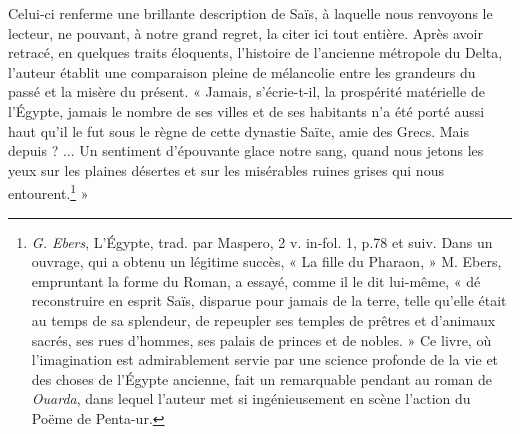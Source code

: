 \documentclass[a4paper, 11pt, oneside]{article}
\begin{document}
Celui-ci renferme une brillante description de Saïs, à laquelle nous renvoyons le lecteur, ne pouvant, à notre grand regret, la citer ici tout entière. Après avoir retracé, en quelques traits éloquents, l'histoire de l'ancienne métropole du Delta, l'auteur établit une comparaison pleine de mélancolie entre les grandeurs du passé et la misère du présent. « Jamais, s'écrie-t-il, la prospérité matérielle de l'Égypte, jamais le nombre de ses villes et de ses habitants n'a été porté aussi haut qu'il le fut sous le règne de cette dynastie Saïte, amie des Grecs. Mais depuis ? ... Un sentiment d'épouvante glace notre sang, quand nous jetons les yeux sur les plaines désertes et sur les misérables ruines grises qui nous entourent.\footnote{\emph{G. Ebers}, L'Égypte, trad. par Maspero, 2 v. in-fol. 1, p.78 et suiv. Dans un ouvrage, qui a obtenu un légitime succès, « La fille du Pharaon, » M. Ebers, empruntant la forme du Roman, a essayé, comme il le dit lui-même, « dé reconstruire en esprit Saïs, disparue pour jamais de la terre, telle qu'elle était au temps de sa splendeur, de repeupler ses temples de prêtres et d'animaux sacrés, ses rues d'hommes, ses palais de princes et de nobles. » Ce livre, où l'imagination est admirablement servie par une science profonde de la vie et des choses de l'Égypte ancienne, fait un remarquable pendant au roman de \emph{Ouarda}, dans lequel l'auteur met si ingénieusement en scène l'action du Poëme de Penta-ur.} »
\end{document}
